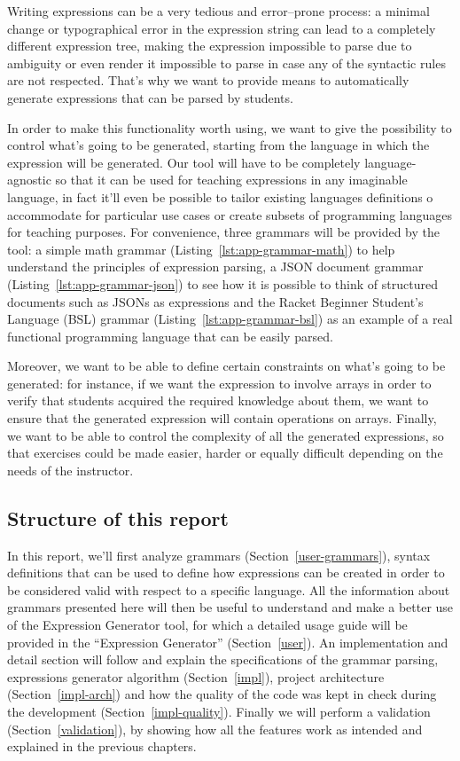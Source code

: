 \documentclass[]{usiinfbachelorproject}
\begin{document}
Writing expressions can be a very tedious and error–prone process: a minimal
change or typographical error in the expression string can lead to a completely
different expression tree, making the expression impossible to parse due
to ambiguity or even render it impossible to parse in case any of the syntactic
rules are not respected.
That's why we want to provide means to automatically generate expressions that
can be parsed by students.

In order to make this functionality worth using, we want to give the
possibility to control what's going to be generated, starting from the language
in which the expression will be generated. Our tool will have to be completely
language-agnostic so that it can be used for teaching expressions in any
imaginable language, in fact it'll even be possible to tailor existing languages
definitions o accommodate for particular use cases or create subsets of
programming languages for teaching purposes.
For convenience, three grammars will be provided by the tool: a simple math
grammar (Listing~\ref{lst:app-grammar-math}) to help understand the principles
of expression parsing, a JSON document grammar
(Listing~\ref{lst:app-grammar-json}) to see how it is possible to think of
structured documents such as JSONs as expressions and the Racket Beginner
Student's Language (BSL) grammar (Listing~\ref{lst:app-grammar-bsl}) as an
example of a real functional programming language that can be easily parsed.

Moreover, we want to be able to define certain constraints on what's going to be
generated: for instance, if we want the expression to involve arrays in order to
verify that students acquired the required knowledge about them, we want to
ensure that the generated expression will contain operations on arrays.
Finally, we want to be able to control the complexity of all the generated
expressions, so that exercises could be made easier, harder or equally
difficult depending on the needs of the instructor.

\subsection*{Structure of this report}

In this report, we'll first analyze grammars (Section~\ref{user-grammars}),
syntax definitions that can be used to define how expressions can be created in
order to be considered valid with respect to a specific language. All the
information about grammars presented here will then be useful to understand and
make a better use of the Expression Generator tool, for which a detailed usage
guide will be provided in the ``Expression Generator'' (Section~\ref{user}).
An implementation and detail section will follow and explain the specifications
of the grammar parsing, expressions generator algorithm (Section~\ref{impl}),
project architecture (Section~\ref{impl-arch}) and how the quality of the code
was kept in check during the development (Section~\ref{impl-quality}).
Finally we will perform a validation (Section~\ref{validation}), by showing
how all the features work as intended and explained in the previous chapters.
\end{document}
